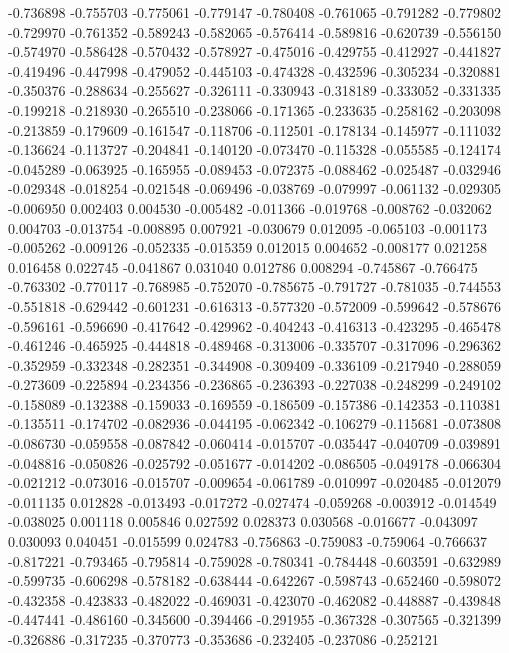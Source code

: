 -0.736898
-0.755703
-0.775061
-0.779147
-0.780408
-0.761065
-0.791282
-0.779802
-0.729970
-0.761352
-0.589243
-0.582065
-0.576414
-0.589816
-0.620739
-0.556150
-0.574970
-0.586428
-0.570432
-0.578927
-0.475016
-0.429755
-0.412927
-0.441827
-0.419496
-0.447998
-0.479052
-0.445103
-0.474328
-0.432596
-0.305234
-0.320881
-0.350376
-0.288634
-0.255627
-0.326111
-0.330943
-0.318189
-0.333052
-0.331335
-0.199218
-0.218930
-0.265510
-0.238066
-0.171365
-0.233635
-0.258162
-0.203098
-0.213859
-0.179609
-0.161547
-0.118706
-0.112501
-0.178134
-0.145977
-0.111032
-0.136624
-0.113727
-0.204841
-0.140120
-0.073470
-0.115328
-0.055585
-0.124174
-0.045289
-0.063925
-0.165955
-0.089453
-0.072375
-0.088462
-0.025487
-0.032946
-0.029348
-0.018254
-0.021548
-0.069496
-0.038769
-0.079997
-0.061132
-0.029305
-0.006950
0.002403
0.004530
-0.005482
-0.011366
-0.019768
-0.008762
-0.032062
0.004703
-0.013754
-0.008895
0.007921
-0.030679
0.012095
-0.065103
-0.001173
-0.005262
-0.009126
-0.052335
-0.015359
0.012015
0.004652
-0.008177
0.021258
0.016458
0.022745
-0.041867
0.031040
0.012786
0.008294
-0.745867
-0.766475
-0.763302
-0.770117
-0.768985
-0.752070
-0.785675
-0.791727
-0.781035
-0.744553
-0.551818
-0.629442
-0.601231
-0.616313
-0.577320
-0.572009
-0.599642
-0.578676
-0.596161
-0.596690
-0.417642
-0.429962
-0.404243
-0.416313
-0.423295
-0.465478
-0.461246
-0.465925
-0.444818
-0.489468
-0.313006
-0.335707
-0.317096
-0.296362
-0.352959
-0.332348
-0.282351
-0.344908
-0.309409
-0.336109
-0.217940
-0.288059
-0.273609
-0.225894
-0.234356
-0.236865
-0.236393
-0.227038
-0.248299
-0.249102
-0.158089
-0.132388
-0.159033
-0.169559
-0.186509
-0.157386
-0.142353
-0.110381
-0.135511
-0.174702
-0.082936
-0.044195
-0.062342
-0.106279
-0.115681
-0.073808
-0.086730
-0.059558
-0.087842
-0.060414
-0.015707
-0.035447
-0.040709
-0.039891
-0.048816
-0.050826
-0.025792
-0.051677
-0.014202
-0.086505
-0.049178
-0.066304
-0.021212
-0.073016
-0.015707
-0.009654
-0.061789
-0.010997
-0.020485
-0.012079
-0.011135
0.012828
-0.013493
-0.017272
-0.027474
-0.059268
-0.003912
-0.014549
-0.038025
0.001118
0.005846
0.027592
0.028373
0.030568
-0.016677
-0.043097
0.030093
0.040451
-0.015599
0.024783
-0.756863
-0.759083
-0.759064
-0.766637
-0.817221
-0.793465
-0.795814
-0.759028
-0.780341
-0.784448
-0.603591
-0.632989
-0.599735
-0.606298
-0.578182
-0.638444
-0.642267
-0.598743
-0.652460
-0.598072
-0.432358
-0.423833
-0.482022
-0.469031
-0.423070
-0.462082
-0.448887
-0.439848
-0.447441
-0.486160
-0.345600
-0.394466
-0.291955
-0.367328
-0.307565
-0.321399
-0.326886
-0.317235
-0.370773
-0.353686
-0.232405
-0.237086
-0.252121
